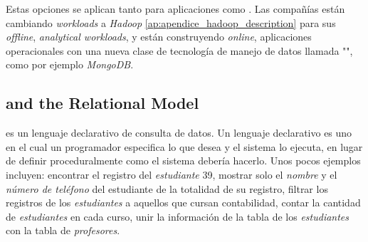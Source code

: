Estas opciones se aplican tanto para aplicaciones  como . Las compañías están cambiando \textit{workloads} a \textit{Hadoop} \ref{ap:apendice_hadoop_description} para sus \textit{offline}, \textit{analytical workloads}, y están construyendo \textit{online}, aplicaciones operacionales con una nueva clase de tecnología de manejo de datos llamada "", como por ejemplo \textit{MongoDB}.

\subsection{ and the Relational Model}

 es un lenguaje declarativo de consulta de datos. Un lenguaje declarativo es uno en el cual un programador especifica lo que desea y el sistema lo ejecuta, en lugar de definir proceduralmente como el sistema debería hacerlo. Unos pocos ejemplos incluyen: encontrar el registro del \textit{estudiante} 39, mostrar solo el \textit{nombre} y el \textit{número de teléfono} del estudiante de la totalidad de su registro, filtrar los registros de los \textit{estudiantes} a aquellos que cursan contabilidad, contar la cantidad de \textit{estudiantes} en cada curso, unir la información de la tabla de los \textit{estudiantes} con la tabla de \textit{profesores}.


